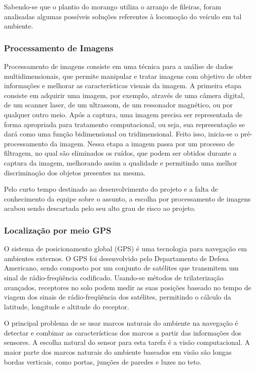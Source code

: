    Sabendo-se que o plantio do morango utiliza o arranjo de fileiras, foram analisadas algumas possíveis soluções referentes à locomoção do veículo em tal ambiente.

  \subsubsection{Processamento de Imagens}

  Processamento de imagens consiste em uma técnica para a análise de dados multidimensionais, que permite manipular e tratar imagens com objetivo de obter informações e melhorar as características visuais da imagem.  A primeira etapa consiste em adquirir uma imagem, por exemplo, através de uma câmera digital, de um scanner laser, de um ultrassom, de um ressonador magnético, ou por qualquer outro meio. Após a captura, uma imagem precisa ser representada de forma apropriada para tratamento computacional, ou seja, sua representação se dará como uma função bidimensional ou tridimensional. Feito isso, inicia-se o pré-processamento da imagem. Nessa etapa a imagem passa por um processo de filtragem, no qual são eliminados os ruídos, que podem ser obtidos durante a captura da imagem, melhorando assim a qualidade e permitindo uma melhor discriminação dos objetos presentes na mesma.
 
  Pelo curto tempo destinado ao desenvolvimento do projeto e a falta de conhecimento da equipe sobre o assunto, a escolha por processamento de imagens acabou sendo descartada pelo seu alto grau de risco ao projeto.

  \subsubsection{Localização por meio GPS}

  O sistema de posicionamento global (GPS) é uma tecnologia para navegação em ambientes externos. O GPS foi desenvolvido pelo Departamento de Defesa Americano, sendo composto por um conjunto de satélites que transmitem um sinal de rádio-freqüência codificado. Usando-se métodos de trilaterização avançados, receptores no solo podem medir as suas posições baseado no tempo de viagem dos sinais de rádio-freqüência dos satélites, permitindo o cálculo da latitude, longitude e altitude do receptor.
 
O principal problema de se usar marcos naturais do ambiente na navegação é detectar e combinar as características dos marcos a partir das informações dos sensores. A escolha natural do sensor para esta tarefa é a visão computacional. A maior parte dos marcos naturais do ambiente baseados em visão são longas bordas verticais, como portas, junções de paredes e luzes no teto.
 

